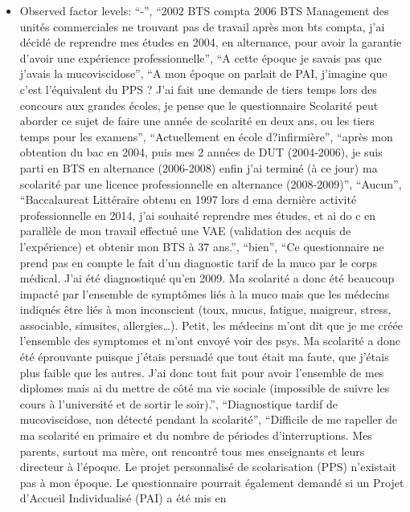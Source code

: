 \documentclass[
  letterpaper,
  DIV=11,
  numbers=noendperiod]{scrartcl}
\providecommand{\tightlist}{%
  \setlength{\itemsep}{0pt}\setlength{\parskip}{0pt}}
\begin{document}
\emini

\begin{itemize}
\tightlist
\item
  Observed factor levels: ``-'', ``2002 BTS compta 2006 BTS Management
  des unités commerciales ne trouvant pas de travail après mon bts
  compta, j'ai décidé de reprendre mes études en 2004, en alternance,
  pour avoir la garantie d'avoir une expérience professionnelle'', ``A
  cette époque je savais pas que j'avais la mucoviscidose'', ``A mon
  époque on parlait de PAI, j'imagine que c'est l'équivalent du PPS ?
  J'ai fait une demande de tiers temps lors des concours aux grandes
  écoles, je pense que le questionnaire Scolarité peut aborder ce sujet
  de faire une année de scolarité en deux ans, ou les tiers temps pour
  les examens'', ``Actuellement en école d?infirmière'', ``après mon
  obtention du bac en 2004, puis mes 2 années de DUT (2004-2006), je
  suis parti en BTS en alternance (2006-2008) enfin j'ai terminé (à ce
  jour) ma scolarité par une licence professionnelle en alternance
  (2008-2009)'', ``Aucun'', ``Baccalaureat Littéraire obtenu en 1997
  lors d ema dernière activité professionnelle en 2014, j'ai souhaité
  reprendre mes études, et ai do c en parallèle de mon travail effectué
  une VAE (validation des acquis de l'expérience) et obtenir mon BTS à
  37 ans.'', ``bien'', ``Ce questionnaire ne prend pas en compte le fait
  d'un diagnostic tarif de la muco par le corps médical. J'ai été
  diagnostiqué qu'en 2009. Ma scolarité a donc été beaucoup impacté par
  l'ensemble de symptômes liés à la muco mais que les médecins indiqués
  être liés à mon inconscient (toux, mucus, fatigue, maigreur, stress,
  associable, sinusites, allergies\ldots). Petit, les médecins m'ont dit
  que je me créée l'ensemble des symptomes et m'ont envoyé voir des
  psys. Ma scolarité a donc été éprouvante puisque j'étais persuadé que
  tout était ma faute, que j'étais plus faible que les autres. J'ai donc
  tout fait pour avoir l'ensemble de mes diplomes mais ai du mettre de
  côté ma vie sociale (impossible de suivre les cours à l'université et
  de sortir le soir).'', ``Diagnostique tardif de mucoviscidose, non
  détecté pendant la scolarité'', ``Difficile de me rapeller de ma
  scolarité en primaire et du nombre de périodes d'interruptions. Mes
  parents, surtout ma mère, ont rencontré tous mes enseignants et leurs
  directeur à l'époque. Le projet personnalisé de scolarisation (PPS)
  n'existait pas à mon époque. Le questionnaire pourrait également
  demandé si un Projet d'Accueil Individualisé (PAI) a été mis en

\end{itemize}
\end{document}
